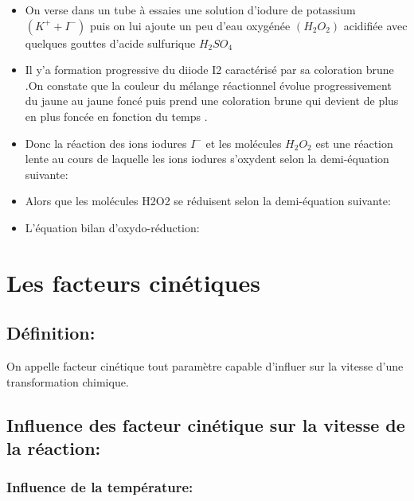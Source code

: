 \documentclass[12pt]{article}
\begin{document}
\begin{itemize}
	\item On verse dans un tube à essaies une solution d'iodure de potassium $(K^+ + I^-)$ puis on lui ajoute un peu d'eau oxygénée $(H_2O_2)$ acidifiée avec quelques gouttes d'acide sulfurique $H_2SO_4$
	\item Il y'a formation progressive du diiode I2 caractérisé par sa coloration brune .On constate que la couleur du mélange réactionnel
évolue progressivement du jaune au jaune foncé puis prend une coloration brune qui devient de plus en plus foncée en fonction du
temps .
\item Donc la réaction des ions iodures $I^-$ et les molécules $H_2O_2$ est une réaction lente au cours de laquelle les
	ions iodures s'oxydent selon la demi-équation suivante: 

\item Alors que les molécules H2O2 se réduisent selon la demi-équation suivante: 


\item L'équation bilan d'oxydo-réduction: 

\end{itemize}
\section{Les facteurs cinétiques }
\subsection{Définition: }
On appelle facteur cinétique tout paramètre capable d'influer sur la vitesse d'une transformation chimique.

\subsection{Influence des facteur cinétique sur la vitesse de la réaction:}
\subsubsection{Influence de la température: }
\end{document}
